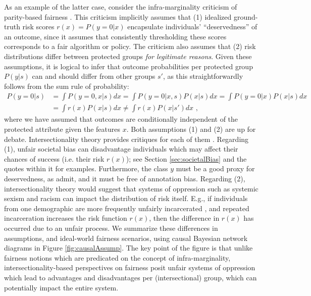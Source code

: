 \documentclass[11pt,dvipdfm]{article}
\begin{document}
As an example of the latter case, consider the infra-marginality criticism of parity-based fairness \cite{corbettdavies2018measure, simoiu2017problem}. This criticism implicitly assumes that (1) idealized ground-truth risk scores $r(x) = P(y=0|x)$ encapsulate individuals' ``deservedness'' of an outcome, since it assumes that consistently thresholding these scores corresponds to a fair algorithm or policy.  The criticism also assumes that (2) risk distributions differ between protected groups \emph{for legitimate reasons}.  Given these assumptions, it is logical to infer that outcome probabilities per protected group $P(y|s)$ can and should differ from other groups $s'$, as this straightforwardly follows from the sum rule of probability:
\begin{align}
    P(y = 0|s) &= \int P(y = 0,x|s) dx = \int P(y = 0|x,s) P(x|s) dx = \int P(y = 0|x) P(x|s) dx \nonumber \\
    &= \int r(x) P(x|s) dx \neq \int r(x) P(x|s') dx \mbox{ ,}
\end{align}
where we have assumed that outcomes are conditionally independent of the protected attribute given the features $x$.  Both assumptions (1) and (2) are up for debate.  Intersectionality theory provides critiques for each of them \cite{crenshaw1989demarginalizing,collins2002black}.  Regarding (1), unfair societal bias can disadvantage individuals which may affect their chances of success (i.e. their risk $r(x)$); see Section \ref{sec:societalBias} and the quotes within it for examples.  Furthermore, the class $y$ must be a good proxy for deservedness, as \cite{corbettdavies2018measure} admit, and it must be free of annotation bias.  Regarding (2), intersectionality theory would suggest that systems of oppression such as systemic sexism and racism can impact the distribution of risk itself.  E.g., if individuals from one demographic are more frequently unfairly incarcerated \cite{alexander2012new}, and repeated incarceration increases the risk function $r(x)$, then the difference in $r(x)$ has occurred due to an unfair process.  We summarize these differences in assumptions, and ideal-world fairness scenarios, using causal Bayesian network diagrams in Figure \ref{fig:causalAssump}.  The key point of the figure is that unlike fairness notions which are predicated on the concept of infra-marginality, intersectionality-based perspectives on fairness posit unfair systems of oppression which lead to advantages and disadvantages per (intersectional) group, which can potentially impact the entire system. 
\end{document}
